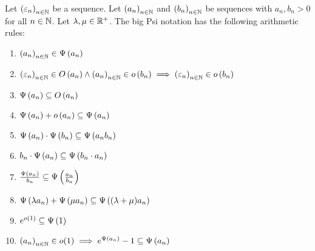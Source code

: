 \begin{theorem} \label{thm:bigpsi:rules}
  Let $\left({\varepsilon_n}\right)_{{n}\in\mathbb N}$ be a sequence. Let $\left({a_n}\right)_{{n}\in\mathbb N}$ and $\left({b_n}\right)_{{n}\in\mathbb N}$ be sequences with $a_n,b_n > 0$ for all $n\in\mathbb N$. Let $\lambda, \mu \in \mathbb R^{+}$. The big Psi notation has the following arithmetic rules:

  \begin{enumerate}
    \item $\left({a_n}\right)_{{n}\in\mathbb N} \in \Psi\left( {a_n} \right)$
    \item $\left({\varepsilon_n}\right)_{{n}\in\mathbb N} \in O\left( {a_n} \right) \land \left({a_n}\right)_{{n}\in\mathbb N} \in o\left( {b_n} \right) \implies \left({\varepsilon_n}\right)_{{n}\in\mathbb N} \in o\left( {b_n} \right)$
    \item $\Psi\left( {a_n} \right) \subseteq O\left( {a_n} \right)$
    \item $\Psi\left( {a_n} \right) + o\left( {a_n} \right) \subseteq \Psi\left( {a_n} \right)$
    \item $\Psi\left( {a_n} \right)\cdot \Psi\left( {b_n} \right) \subseteq \Psi\left( {a_n b_n} \right)$
    \item $b_n \cdot \Psi\left( {a_n} \right) \subseteq \Psi\left( {b_n \cdot a_n} \right)$
    \item $\frac{\Psi\left( {a_n} \right)}{b_n} \subseteq \Psi\left( {\frac{a_n}{b_n}} \right)$
    \item $\Psi\left( {\lambda a_n} \right) + \Psi\left( {\mu a_n} \right) \subseteq \Psi\left( {(\lambda+\mu)a_n} \right)$
    \item $e^{o\left( {1} \right)} \subseteq \Psi\left( {1} \right)$
    \item $\left({a_n}\right)_{{n}\in\mathbb N} \in o(1) \implies e^{\Psi\left( {a_n} \right)}-1 \subseteq \Psi\left( {a_n} \right)$
  \end{enumerate}
\end{theorem}
